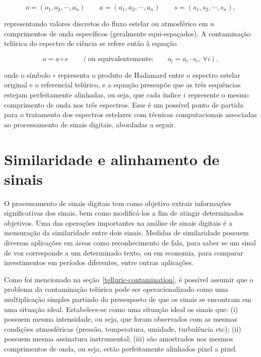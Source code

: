 \begin{equation*}
    o = (o_1, o_2, \cdots, o_{n}) \qquad a = (a_1, a_2, \cdots, a_{n}) \qquad s = (s_1, s_2, \cdots, s_{n}), 
\end{equation*}

\noindent representando valores discretos do fluxo estelar ou atmosférico em $n$ comprimentos de onda específicos (geralmente equi-espaçados). A contaminação telúrica do espectro de ciência se refere então à equação

\begin{equation*}
    o = a \circ s \qquad \left(\mbox{ou equivalentemente:} \qquad o_i = a_i\cdot s_i,\ \forall i\right),
\end{equation*}

\noindent onde o símbolo $\circ$ representa o produto de Hadamard entre o espectro estelar original e o referencial telúrico, e a equação pressupõe que as três sequências estejam perfeitamente alinhadas, ou seja, que cada índice $i$ represente o mesmo comprimento de onda nos três espectros. Esse é um possível ponto de partida para o tratamento dos espectros estelares com técnicas computacionais associadas ao processamento de sinais digitais, abordadas a seguir.


\section{Similaridade e alinhamento de sinais}\label{similarity-and-signal-alignment}

O processamento de sinais digitais tem como objetivo extrair informações significativas dos sinais, bem como modificá-los a fim de atingir determinados objetivos. Uma das operações importantes na análise de sinais digitais é a mensuração da similaridade entre dois sinais. Medidas de similaridade possuem diversas aplicações em áreas como reconhecimento de fala, para saber se um sinal de voz corresponde a um determinado texto, ou em economia, para comparar investimentos em períodos diferentes, entre outras aplicações.

Como foi mencionado na seção~\ref{telluric-contamination}, é possível assumir que o problema da contaminação telúrica pode ser operacionalizado como uma multiplicação simples partindo do pressuposto de que os sinais se encontram em uma situação ideal. Estabelece-se como uma situação ideal os sinais que: (i) possuem mesma intensidade, ou seja, que foram observados com as mesmas condições atmosféricas (pressão, temperatura, umidade, turbulência etc); (ii) possuem mesma assinatura instrumental; (iii) são amostrados nos mesmos comprimentos de onda, ou seja, estão perfeitamente alinhados pixel a pixel. 

